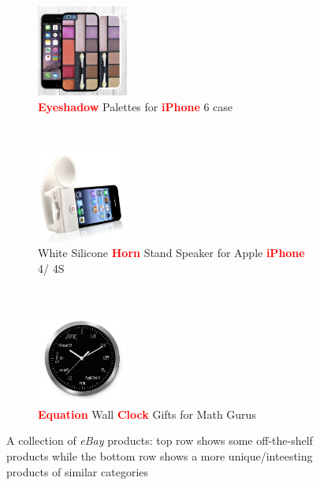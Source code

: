 \documentclass{article} %
\begin{document}
\begin{figure}
\label{fig:ebay-products}
        \centering
         \begin{subfigure}[b]{0.3\textwidth}
        	        \centering
                \includegraphics[width=30mm]{figures/eyeshadow-iphone-case.jpg}
                \caption{\textcolor{red}{{\bf Eyeshadow}} Palettes for \textcolor{red}{{\bf iPhone}} 6 case}
                \label{fig:eyeshadow-iphone-case}
        \end{subfigure}
              ~ %
        \begin{subfigure}[b]{0.3\textwidth}
		 \centering
                \includegraphics[width=30mm]{figures/horn-iphone-speaker.jpg}
\caption{White Silicone \textcolor{red}{{\bf Horn}} Stand Speaker for Apple \textcolor{red}{{\bf iPhone}} 4/ 4S}                \label{fig:zeppelin-speaker}
        \end{subfigure}
       ~ %
        \begin{subfigure}[b]{0.3\textwidth}
		 \centering
                \includegraphics[width=30mm]{figures/geeky-clock.jpg}
\caption{\textcolor{red}{{\bf Equation}} Wall \textcolor{red}{{\bf Clock}} Gifts for Math Gurus}                \label{fig:geeky-clock}
        \end{subfigure}
       \caption{A collection of {\em eBay} products: top row shows some off-the-shelf products while the bottom row shows a more unique/inteesting products of similar categories}\label{fig:ebay-products}
\end{figure}
\end{document}
